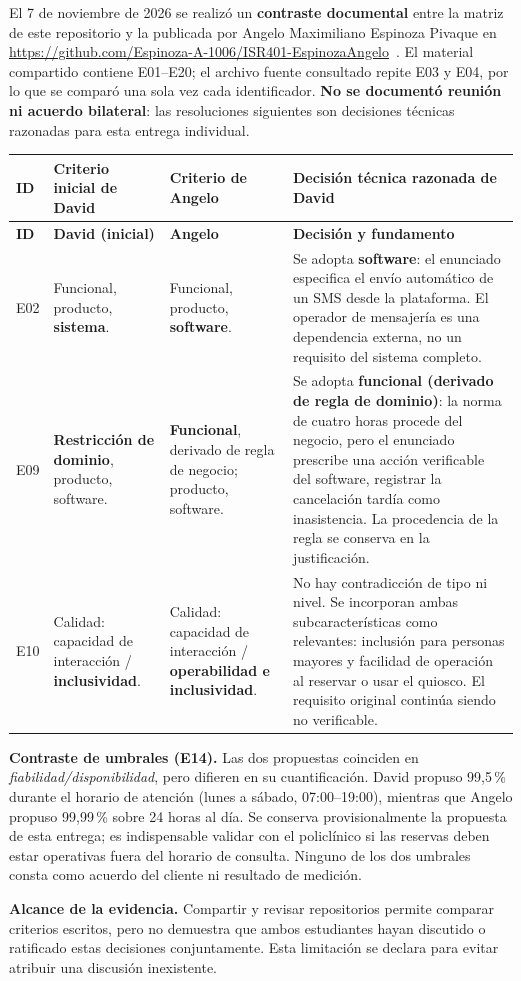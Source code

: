 El 7 de noviembre de 2026 se realizó un \textbf{contraste documental} entre la matriz de este repositorio y la publicada por Angelo Maximiliano Espinoza Pivaque en \url{https://github.com/Espinoza-A-1006/ISR401-EspinozaAngelo}~\cite{angelo2026}. El material compartido contiene E01--E20; el archivo fuente consultado repite E03 y E04, por lo que se comparó una sola vez cada identificador. \textbf{No se documentó reunión ni acuerdo bilateral}: las resoluciones siguientes son decisiones técnicas razonadas para esta entrega individual.

{\footnotesize
\begin{longtable}{|p{0.8cm}|p{2.4cm}|p{2.55cm}|p{7.1cm}|}
\hline
\textbf{ID} & \textbf{Criterio inicial de David} & \textbf{Criterio de Angelo} & \textbf{Decisión técnica razonada de David} \\ \hline
\endfirsthead
\hline \textbf{ID} & \textbf{David (inicial)} & \textbf{Angelo} & \textbf{Decisión y fundamento} \\ \hline
\endhead
E02 & Funcional, producto, \textbf{sistema}. & Funcional, producto, \textbf{software}. & Se adopta \textbf{software}: el enunciado especifica el envío automático de un SMS desde la plataforma. El operador de mensajería es una dependencia externa, no un requisito del sistema completo. \\ \hline
E09 & \textbf{Restricción de dominio}, producto, software. & \textbf{Funcional}, derivado de regla de negocio; producto, software. & Se adopta \textbf{funcional (derivado de regla de dominio)}: la norma de cuatro horas procede del negocio, pero el enunciado prescribe una acción verificable del software, registrar la cancelación tardía como inasistencia. La procedencia de la regla se conserva en la justificación. \\ \hline
E10 & Calidad: capacidad de interacción / \textbf{inclusividad}. & Calidad: capacidad de interacción / \textbf{operabilidad e inclusividad}. & No hay contradicción de tipo ni nivel. Se incorporan ambas subcaracterísticas como relevantes: inclusión para personas mayores y facilidad de operación al reservar o usar el quiosco. El requisito original continúa siendo no verificable. \\ \hline
\end{longtable}
}

\textbf{Contraste de umbrales (E14).} Las dos propuestas coinciden en \emph{fiabilidad/disponibilidad}, pero difieren en su cuantificación. David propuso 99,5\,\% durante el horario de atención (lunes a sábado, 07:00--19:00), mientras que Angelo propuso 99,99\,\% sobre 24 horas al día. Se conserva provisionalmente la propuesta de esta entrega; es indispensable validar con el policlínico si las reservas deben estar operativas fuera del horario de consulta. Ninguno de los dos umbrales consta como acuerdo del cliente ni resultado de medición.

\textbf{Alcance de la evidencia.} Compartir y revisar repositorios permite comparar criterios escritos, pero no demuestra que ambos estudiantes hayan discutido o ratificado estas decisiones conjuntamente. Esta limitación se declara para evitar atribuir una discusión inexistente.
